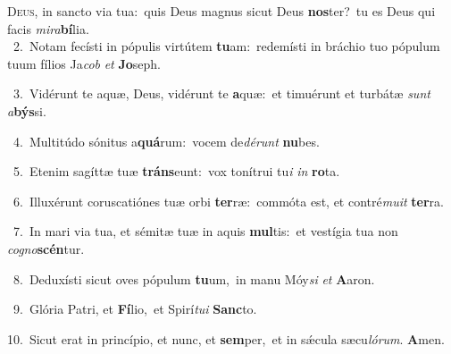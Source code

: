 \lettrine{\initial\textcolor{\initialcolor}{D}}{eus,} in sancto via tua:~\dagger quis Deus magnus sicut Deus \textbf{nos}\-ter?~\star tu es Deus qui facis \textit{mi}\-\textit{ra}\textbf{bí}lia.\\
{\numbfont\textcolor{\numbcolor}{~2.}}~Notam fecísti in pópulis virtútem \textbf{tu}\-am:~\star redemísti in bráchio tuo pópulum tuum fílios Ja\textit{cob} \textit{et} \textbf{Jo}\-seph.\par
{\numbfont\textcolor{\numbcolor}{~3.}}~Vidérunt te aquæ, Deus, vidérunt te \textbf{a}\-quæ:~\star et timuérunt et turbátæ \textit{sunt} \textit{a}\-\textbf{býs}si.\par
{\numbfont\textcolor{\numbcolor}{~4.}}~Multitúdo sónitus a\-\textbf{quá}\-rum:~\star vocem de\-\textit{dé}\-\textit{runt} \textbf{nu}\-bes.\par
{\numbfont\textcolor{\numbcolor}{~5.}}~Etenim sagíttæ tuæ \textbf{tráns}\-eunt:~\star vox tonítrui tu\textit{i} \textit{in} \textbf{ro}\-ta.\par
{\numbfont\textcolor{\numbcolor}{~6.}}~Illuxérunt coruscatiónes tuæ orbi \textbf{ter}\-ræ:~\star commóta est, et contré\-\textit{mu}\-\textit{it} \textbf{ter}\-ra.\par
{\numbfont\textcolor{\numbcolor}{~7.}}~In mari via tua, et sémitæ tuæ in aquis \textbf{mul}\-tis:~\star et vestígia tua non \textit{co}\-\textit{gno}\textbf{scén}tur.\par
{\numbfont\textcolor{\numbcolor}{~8.}}~Deduxísti sicut oves pópulum \textbf{tu}\-um,~\star in manu Móy\textit{si} \textit{et} \textbf{A}\-aron.\par
{\numbfont\textcolor{\numbcolor}{~9.}}~Glória Patri, et \textbf{Fí}\-lio,~\star et Spirí\-\textit{tu}\-\textit{i} \textbf{Sanc}\-to.\par
{\numbfont\textcolor{\numbcolor}{10.}}~Sicut erat in princípio, et nunc, et \textbf{sem}\-per,~\star et in sǽcula sæcu\-\textit{ló}\-\textit{rum}. \textbf{A}\-men.\par
